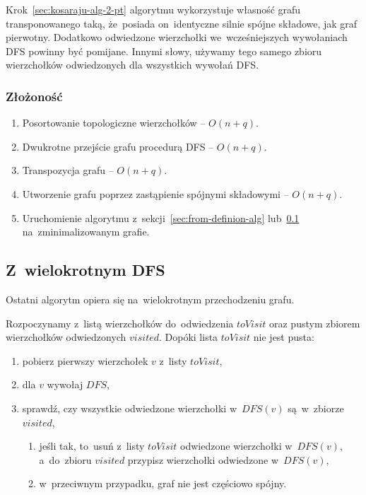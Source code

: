 \documentclass[a4paper,12pt]{mwart}
\begin{document}
Krok~\ref{sec:kosaraju-alg-2-pt} algorytmu wykorzystuje własność grafu
transponowanego taką, że~posiada on~identyczne silnie spójne składowe, jak graf
pierwotny. Dodatkowo odwiedzone wierzchołki we~wcześniejszych wywołaniach DFS
powinny być pomijane. Innymi słowy, używamy tego samego zbioru wierzchołków
odwiedzonych dla wszystkich wywołań DFS.

\subsubsection{Złożoność}

\begin{enumerate}
\item Posortowanie topologiczne wierzchołków -- $O(n + q)$.
\item Dwukrotne przejście grafu procedurą DFS -- $O(n + q)$.
\item Transpozycja grafu -- $O(n + q)$.
\item Utworzenie grafu poprzez zastąpienie spójnymi składowymi -- $O(n + q)$.
\item Uruchomienie algorytmu z~sekcji~\ref{sec:from-definion-alg}
  lub~\ref{sec:multiple-dfs} na~zminimalizowanym grafie.
\end{enumerate}

\subsection{Z~wielokrotnym DFS}
\label{sec:multiple-dfs}

Ostatni algorytm opiera się na~wielokrotnym przechodzeniu grafu.

Rozpoczynamy z~listą wierzchołków do~odwiedzenia $toVisit$ oraz pustym zbiorem
wierzchołków odwiedzonych $visited$. Dopóki lista $toVisit$ nie jest pusta:
\begin{enumerate}
\item pobierz pierwszy wierzchołek $v$ z~listy $toVisit$,
\item dla $v$ wywołaj $DFS$,
\item\label{item:multiple-dfs:cond} sprawdź, czy wszystkie odwiedzone
  wierzchołki w~$DFS(v)$ są~w~zbiorze $visited$,
\begin{enumerate}[label*=\arabic*.]
\item jeśli tak, to~usuń z~listy $toVisit$ odwiedzone wierzchołki w~$DFS(v)$,
  a~do~zbioru $visited$ przypisz wierzchołki odwiedzone w~$DFS(v)$,
\item w~przeciwnym przypadku, graf nie jest częściowo spójny.
\end{enumerate}
\end{enumerate}
\end{document}
